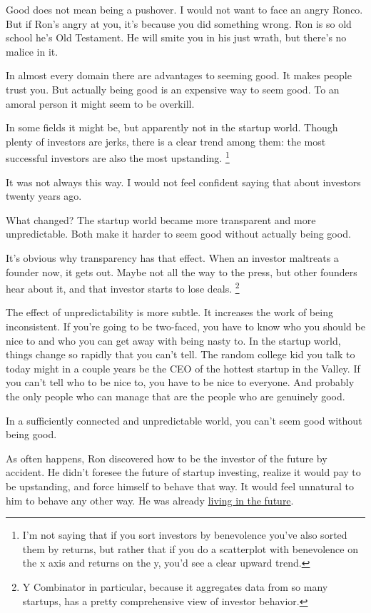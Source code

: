 \documentclass[12pt]{book}
\begin{document}
Good does not mean being a pushover. I would not want to face an angry
Ronco. But if Ron's angry at you, it's because you did something wrong.
Ron is so old school he's Old Testament. He will smite you in his just
wrath, but there's no malice in it.

In almost every domain there are advantages to seeming good. It makes
people trust you. But actually being good is an expensive way to seem
good. To an amoral person it might seem to be overkill.

In some fields it might be, but apparently not in the startup world.
Though plenty of investors are jerks, there is a clear trend among them:
the most successful investors are also the most upstanding.
\footnote{I'm not saying that if you sort investors by benevolence you've
also sorted them by returns, but rather that if you do a scatterplot
with benevolence on the x axis and returns on the y, you'd see a clear
upward trend.}

It was not always this way. I would not feel confident saying that about
investors twenty years ago.

What changed? The startup world became more transparent and more
unpredictable. Both make it harder to seem good without actually being
good.

It's obvious why transparency has that effect. When an investor
maltreats a founder now, it gets out. Maybe not all the way to the
press, but other founders hear about it, and that investor starts to
lose deals. \footnote{Y Combinator in particular, because it aggregates data from so
many startups, has a pretty comprehensive view of investor behavior.}

The effect of unpredictability is more subtle. It increases the work of
being inconsistent. If you're going to be two-faced, you have to know
who you should be nice to and who you can get away with being nasty to.
In the startup world, things change so rapidly that you can't tell. The
random college kid you talk to today might in a couple years be the CEO
of the hottest startup in the Valley. If you can't tell who to be nice
to, you have to be nice to everyone. And probably the only people who
can manage that are the people who are genuinely good.

In a sufficiently connected and unpredictable world, you can't seem good
without being good.

As often happens, Ron discovered how to be the investor of the future by
accident. He didn't foresee the future of startup investing, realize it
would pay to be upstanding, and force himself to behave that way. It
would feel unnatural to him to behave any other way. He was already
\href{startupideas.html}{living in the future}.
\end{document}
